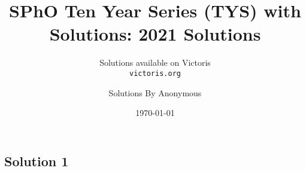 \documentclass{article}
\title{SPhO Ten Year Series (TYS) with Solutions: 2021 Solutions}
\author{
    Solutions available on Victoris\\
    \texttt{victoris.org}
    \and 
    Solutions By Anonymous
}
\date{\today}
\begin{document}
\maketitle
\subsection{Solution 1}
\end{document}

